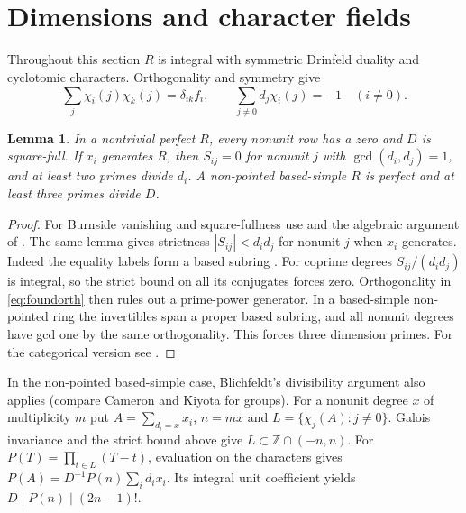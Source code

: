 \documentclass[11pt]{amsart}
\numberwithin{equation}{section}
\newtheorem{lemma}[theorem]{Lemma}
\theoremstyle{definition}
\theoremstyle{plain}
\newcommand{\ZZ}{\mathbb Z}
\begin{document}
\section{Dimensions and character fields}\label{sec:dimensions}
Throughout this section $R$ is integral with symmetric Drinfeld
duality and cyclotomic characters. Orthogonality and symmetry give
\begin{equation}\label{eq:foundorth}
 \sum_j\chi_i(j)\overline{\chi_k(j)}=\delta_{ik}f_i,\qquad
 \sum_{j\ne0}d_j\chi_i(j)=-1\quad(i\ne0).
\end{equation}

\begin{lemma}\label{lem:basic-table}
In a nontrivial perfect $R$, every nonunit row has a zero and $D$ is
square-full. If $x_i$ generates $R$, then $S_{ij}=0$ for nonunit $j$
with $\gcd(d_i,d_j)=1$, and at least two primes divide $d_i$.
A non-pointed based-simple $R$ is perfect and at least three primes
divide $D$.
\end{lemma}
\begin{proof}
For Burnside vanishing and square-fullness use \cite[Theorem~1.2]{BPBurnside} and the algebraic argument of \cite[Lemma~2.5]{BDPcore}. The same lemma gives strictness $|S_{ij}|<d_i d_j$ for nonunit $j$ when $x_i$ generates. Indeed the equality labels form a based subring \cite[Lemma~2.35]{BPBurnside}. For coprime degrees $S_{ij}/(d_i d_j)$ is integral, so the strict bound on all its conjugates forces zero. Orthogonality in \eqref{eq:foundorth} then rules out a prime-power generator. In a based-simple non-pointed ring the invertibles span a proper based subring, and all nonunit degrees have gcd one by the same orthogonality. This forces three dimension primes. For the categorical version see \cite[Lemma~7.1 and Corollary~7.2]{ENOWGT}.
\end{proof}

In the non-pointed based-simple case, Blichfeldt's divisibility
argument also applies (compare Cameron and Kiyota
\cite{CameronKiyota} for groups). For a nonunit degree $x$ of
multiplicity $m$ put $A=\sum_{d_i=x}x_i$,
$n=mx$ and $L=\{\chi_j(A):j\ne0\}$. Galois invariance and the
strict bound above give $L\subset\ZZ\cap(-n,n)$. For
$P(T)=\prod_{t\in L}(T-t)$, evaluation on the characters gives
$P(A)=D^{-1}P(n)\sum_i d_ix_i$. Its integral unit coefficient yields
$D\mid P(n)\mid(2n-1)!$.
\end{document}
